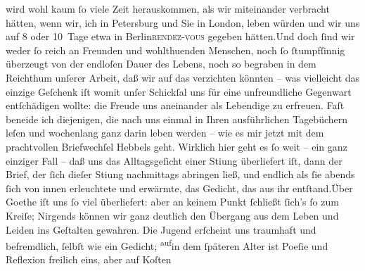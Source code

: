 \begin{ledgroupsized}[t]{13cm}
               wird wohl kaum ſo viele Zeit herauskommen, als wir miteinander verbracht hätten, wenn
               wir, ich in Petersburg und Sie in London, leben würden und wir uns auf 8 oder 10 Tage etwa in Berlin\textsc{rendez-vous} gegeben hätten.\hspace*{1.5em}Und doch ſind wir weder ſo reich an Freunden und wohlthuenden Menschen, noch ſo
               ſtumpfſinnig überzeugt von der endloſen Dauer des Lebens, noch so begraben in dem
               Reichthum unſerer Arbeit, daß wir auf das verzichten {\pb}könnten – was vielleicht das
               einzige Geſchenk iſt womit unſer Schickſal uns für eine unfreundliche Gegenwart
               entſchädigen wollte: die Freude uns aneinander als Lebendige zu erfreuen.\pend
           \pstart
           Faſt beneide ich diejenigen, die nach uns einmal in Ihren ausführlichen Tagebüchern
               leſen und wochenlang ganz darin leben werden – wie es mir jetzt mit dem prachtvollen
                  Briefwechſel Hebbels geht.\pend
           \pstart
           Wirklich hier geht es ſo weit – ein ganz einziger Fall – daß uns das Alltagsgeſicht
               einer Sti{\geminationm}ung überliefert iſt, dann der Brief, der ſich
               dieſer Sti{\geminationm}ung nachmittags abringen ließ, und endlich
               als ſie abends ſich von innen erleuchtete und erwärmte, das Gedicht, das aus ihr
                  entſtand.\hspace*{1.5em}Über Goethe iſt uns ſo viel überliefert: aber an keinem Punkt ſchließt ſich’s ſo
               zum Kreiſe; Nirgends können wir ganz deutlich den Übergang aus dem Leben und Leiden
               ins Geſtalten gewahren. Die Jugend erſcheint uns traumhaft und befremdlich, ſelbſt
               wie ein Gedicht; \substVorne{}\textsuperscript{auf}\substDazwischen{}in\substHinten{} dem ſpäteren Alter ist Poeſie und Reflexion freilich eins, aber auf Koſten

\end{ledgroupsized}
